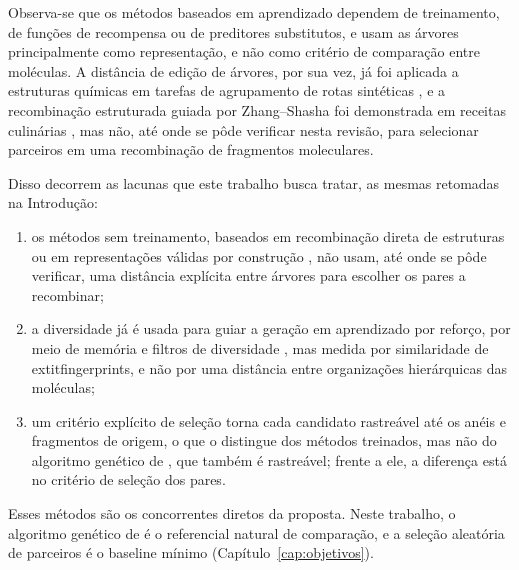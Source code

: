 Observa-se que os métodos baseados em aprendizado dependem de treinamento, de funções de recompensa ou de preditores substitutos, e usam as árvores principalmente como representação, e não como critério de comparação entre moléculas. A distância de edição de árvores, por sua vez, já foi aplicada a estruturas químicas em tarefas de agrupamento de rotas sintéticas \cite{genheden_2021}, e a recombinação estruturada guiada por Zhang--Shasha foi demonstrada em receitas culinárias \cite{cooking_2025}, mas não, até onde se pôde verificar nesta revisão, para selecionar parceiros em uma recombinação de fragmentos moleculares.

Disso decorrem as lacunas que este trabalho busca tratar, as mesmas retomadas na Introdução:
\begin{enumerate}
	\item os métodos sem treinamento, baseados em recombinação direta de estruturas \cite{jensen_2019} ou em representações válidas por construção \cite{krenn_2020}, não usam, até onde se pôde verificar, uma distância explícita entre árvores para escolher os pares a recombinar;
	\item a diversidade já é usada para guiar a geração em aprendizado por reforço, por meio de memória e filtros de diversidade \cite{blaschke_2020}, mas medida por similaridade de 	extit{fingerprints}, e não por uma distância entre organizações hierárquicas das moléculas;
	\item um critério explícito de seleção torna cada candidato rastreável até os anéis e fragmentos de origem, o que o distingue dos métodos treinados, mas não do algoritmo genético de , que também é rastreável; frente a ele, a diferença está no critério de seleção dos pares.
\end{enumerate}
Esses métodos são os concorrentes diretos da proposta. Neste trabalho, o algoritmo genético de  é o referencial natural de comparação, e a seleção aleatória de parceiros é o baseline mínimo (Capítulo~\ref{cap:objetivos}).
